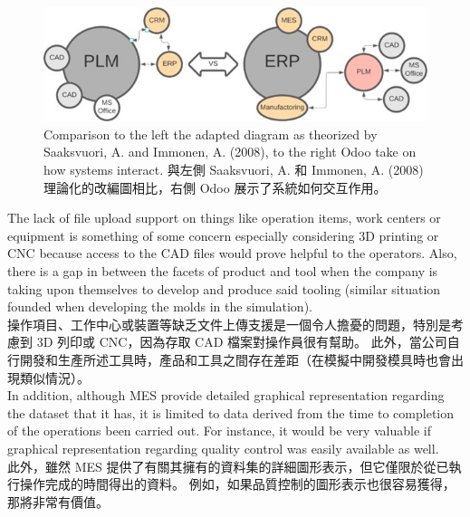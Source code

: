\begin{figure}[hbt!]
\begin{center}
\includegraphics[width=15cm]{74}
\caption{\Large  Comparison to the left the adapted diagram as theorized by Saaksvuori, A. and Immonen, A. (2008), to the right Odoo take on how systems interact. 與左側 Saaksvuori, A. 和 Immonen, A. (2008) 理論化的改編圖相比，右側 Odoo 展示了系統如何交互作用。}\label{fig.74}
\end{center}
\end{figure}

\fontsize{12pt}{2.5pt}\selectfont 
{The lack of file upload support on things like operation items, work centers or equipment is something of some concern especially considering 3D printing or CNC because access to the CAD files would prove helpful to the operators. Also, there is a gap in between the facets of product and tool when the company is taking upon themselves to develop and produce said tooling (similar situation founded when developing the molds in the simulation).}\\[1pt]

\fontsize{12pt}{2.5pt}\selectfont
{操作項目、工作中心或裝置等缺乏文件上傳支援是一個令人擔憂的問題，特別是考慮到 3D 列印或 CNC，因為存取 CAD 檔案對操作員很有幫助。 此外，當公司自行開發和生產所述工具時，產品和工具之間存在差距（在模擬中開發模具時也會出現類似情況）。}\\[1pt]

\fontsize{12pt}{2.5pt}\selectfont 
{In addition, although MES provide detailed graphical representation regarding the dataset that it has, it is limited to data derived from the time to completion of the operations been carried out. For instance, it would be very valuable if graphical representation regarding quality control was easily available as well.}\\[1pt]

\fontsize{12pt}{2.5pt}\selectfont
{此外，雖然 MES 提供了有關其擁有的資料集的詳細圖形表示，但它僅限於從已執行操作完成的時間得出的資料。 例如，如果品質控制的圖形表示也很容易獲得，那將非常有價值。}\\[1pt]


